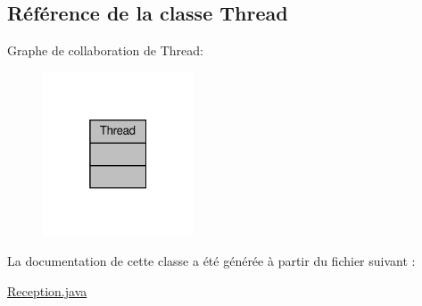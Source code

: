 \hypertarget{class_thread}{}\subsection{Référence de la classe Thread}
\label{class_thread}


Graphe de collaboration de Thread\+:\nopagebreak
\begin{figure}[H]
\begin{center}
\leavevmode
\includegraphics[width=127pt]{class_thread__coll__graph}
\end{center}
\end{figure}


La documentation de cette classe a été générée à partir du fichier suivant \+:\begin{DoxyCompactItemize}
\item 
\hyperlink{_reception_8java}{Reception.\+java}\end{DoxyCompactItemize}
